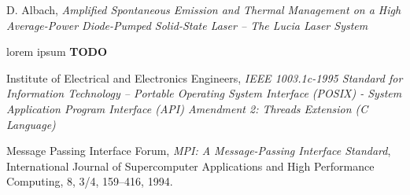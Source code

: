 \begin{thebibliography}{9}


    D. Albach,
    \emph{Amplified Spontaneous Emission and Thermal Management on a High Average-Power Diode-Pumped Solid-State Laser \--- The Lucia Laser System}

    lorem ipsum
    \textbf{TODO}

    Institute of Electrical and Electronics Engineers,
    \emph{IEEE 1003.1c-1995 Standard for Information Technology \---
    Portable Operating System Interface (POSIX) \-- System Application Program Interface (API) Amendment 2: Threads Extension (C Language)}

    Message Passing Interface Forum,
    \emph{MPI: A Message-Passing Interface Standard}, 
    International Journal of Supercomputer Applications and High Performance Computing,
    8, 3/4, 159–416, 1994.

\end{thebibliography}
